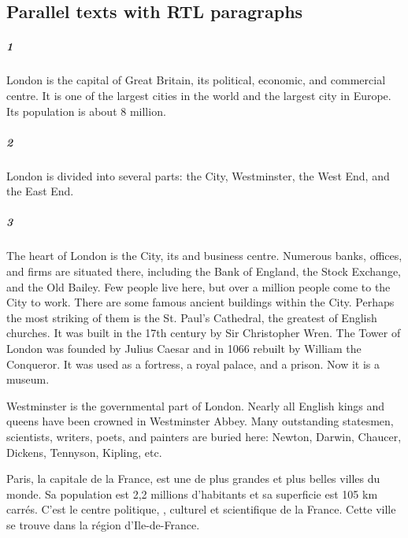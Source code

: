 \documentclass[a4paper]{book}
\begin{document}
\subsection{Parallel texts with RTL paragraphs}

\newpage
\begin{pairs}
\begin{Leftside}\sloppy 
    \beginnumbering
        \pstart
\subparagraph{1}\sloppy
London is the capital of Great Britain, its political, economic, and commercial centre. It is one of the largest cities in the world and the largest city in Europe. Its population is about 8 million.
\pend

        \pstart
\subparagraph{2}\sloppy
London is divided into several parts: the City, Westminster, the West End, and the East End.
        \pend

        \pstart
\subparagraph{3}\sloppy
The heart of London is the City, its  and business centre. Numerous banks, offices, and firms are situated there, including the Bank of England, the Stock Exchange, and the Old Bailey. Few people live here, but over a million people come to the City to work. There are some famous ancient buildings within the City. Perhaps the most striking of them is the St. Paul's Cathedral, the greatest of English churches. It was built in the 17th century by Sir Christopher Wren. The Tower of London was founded by Julius Caesar and in 1066 rebuilt by William the Conqueror. It was used as a fortress, a royal palace, and a prison. Now it is a museum.
        \pend   

        \pstart 
Westminster is the governmental part of London. Nearly all English kings and queens have been crowned in Westminster Abbey. Many outstanding statesmen, scientists, writers, poets, and painters are buried here: Newton, Darwin, Chaucer, Dickens, Tennyson, Kipling, etc.
        \pend

        \pausenumbering
    \end{Leftside} 

\begin{Rightside}\sloppy 
    \beginnumbering

        \pstart 
        Paris, la capitale de la France, est une de plus grandes et plus belles villes du monde. Sa population est 2,2 millions d’habitants et sa superficie est 105 km carrés. C’est le centre politique, , culturel et scientifique de la France. Cette ville se trouve dans la région d’Ile-de-France.
        \pend


\end{Rightside}
\end{pairs}
\end{document}
